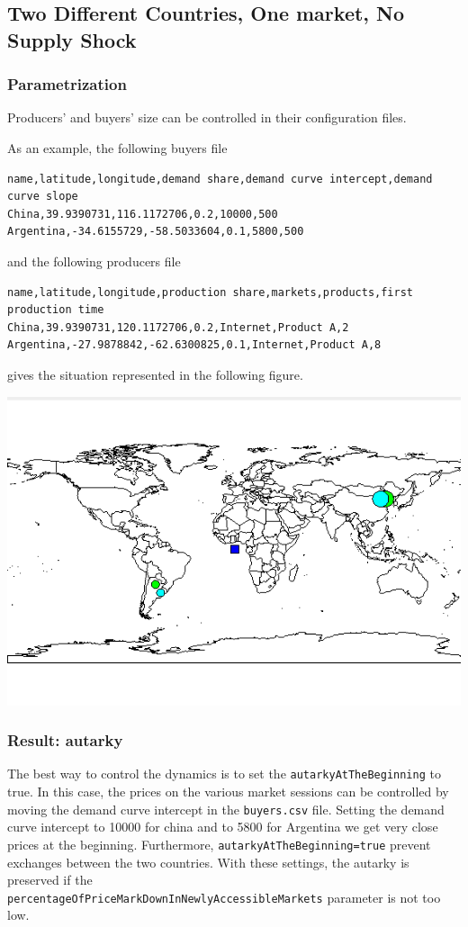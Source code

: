 \documentclass{article}
\begin{document}
\subsection{Two Different Countries, One market, No Supply Shock}
\subsubsection{Parametrization}
Producers' and buyers' size can be controlled in their configuration files. 

As an example, the following buyers file 

\begin{verbatim}
name,latitude,longitude,demand share,demand curve intercept,demand curve slope
China,39.9390731,116.1172706,0.2,10000,500
Argentina,-34.6155729,-58.5033604,0.1,5800,500
\end{verbatim}

and the following producers file

\begin{verbatim}
name,latitude,longitude,production share,markets,products,first production time
China,39.9390731,120.1172706,0.2,Internet,Product A,2
Argentina,-27.9878842,-62.6300825,0.1,Internet,Product A,8
\end{verbatim}

gives the situation represented in the following figure.

\vskip2mm
\noindent
\includegraphics[scale=0.6]{fig_case3_map}


\subsubsection{Result: autarky}
The best way to control the dynamics is to set the \verb+autarkyAtTheBeginning+ to true. In this case, the prices on the various market sessions can be controlled by moving the demand curve intercept in the \verb+buyers.csv+ file.
Setting the demand curve intercept to 10000 for china and to 5800 for Argentina we get very close prices at the beginning. Furthermore, \verb+autarkyAtTheBeginning=true+ prevent exchanges between the two countries.
With these settings, the autarky is preserved if the \\
\verb+percentageOfPriceMarkDownInNewlyAccessibleMarkets+ parameter is not too low.
\end{document}
